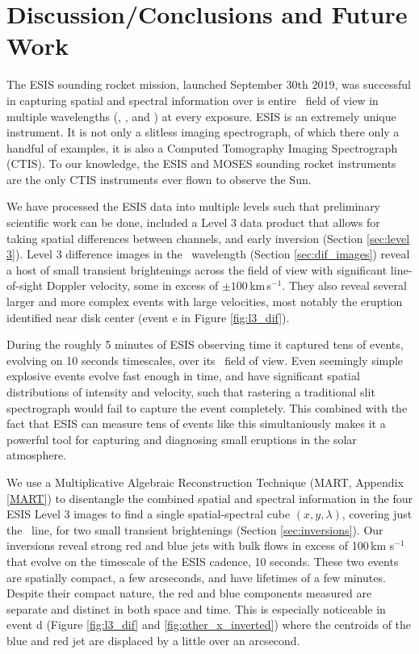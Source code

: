     	
\section{Discussion/Conclusions and Future Work}
	The ESIS sounding rocket mission, launched September 30th 2019, was successful in capturing spatial and spectral information over is entire \esisfov \ field of view in multiple wavelengths (\hei, \mgxbright, and \ov) at every exposure.
	ESIS is an extremely unique instrument.  It is not only a slitless imaging spectrograph, of which there only a handful of examples, it is also a Computed Tomography Imaging Spectrograph (CTIS).  
	To our knowledge, the ESIS and MOSES sounding rocket instruments are the only CTIS instruments ever flown to observe the Sun. 
	
	We have processed the  ESIS data into multiple levels such that preliminary scientific work can be done, included a Level 3 data product that allows for taking spatial differences between channels, and early inversion (Section \ref{sec:level 3}).
	Level 3 difference images in the \ov \ wavelength (Section \ref{sec:dif_images}) reveal a host of small transient brightenings across the field of view with significant line-of-sight Doppler velocity, some in excess of $\pm 100\,$km\,s$^{-1}$.
	They also reveal several larger and more complex events with large velocities, most notably the eruption identified near disk center (event e in Figure \ref{fig:l3_dif}).
	
    During the roughly 5 minutes of ESIS observing time it captured tens of events, evolving on 10 seconds timescales, over its \esisfov \ field of view.
	Even seemingly simple explosive events evolve fast enough in time, and have significant spatial distributions of intensity and velocity, such that rastering a traditional slit spectrograph would fail to capture the event completely. 
	This combined with the fact that ESIS can measure tens of events like this simultaniously makes it a powerful tool for capturing and diagnosing small eruptions in the solar atmosphere.
	
	We use a Multiplicative Algebraic Reconstruction Technique (MART, Appendix \ref{MART}) to disentangle the combined spatial and spectral information in the four ESIS Level 3 images to find a single spatial-spectral cube $(x,y,\lambda)$, covering just the \ov\ line, for two small transient brightenings (Section \ref{sec:inversions}).
	Our inversions reveal strong red and blue jets with bulk flows in excess of 100\,km s$^{-1}$ that evolve on the timescale of the ESIS cadence, 10 seconds.
	These two events are spatially compact, a few arcseconds, and have lifetimes of a few minutes.
	Despite their compact nature, the red and blue components measured are separate and distinct in both space and time. 
	This is especially noticeable in event d (Figure \ref{fig:l3_dif} and \ref{fig:other_x_inverted}) where the centroids of the blue and red jet are displaced by a little over an arcsecond. 
	
